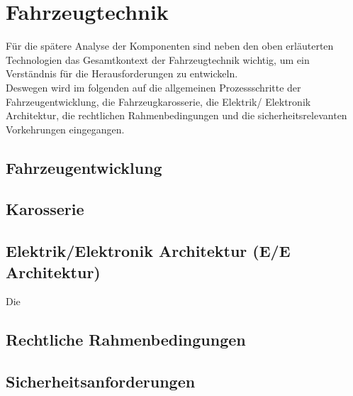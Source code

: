 \section{Fahrzeugtechnik}
Für die spätere Analyse der Komponenten sind neben den oben erläuterten Technologien das Gesamtkontext der Fahrzeugtechnik wichtig, um ein Verständnis für die Herausforderungen zu entwickeln.\\
Deswegen wird im folgenden auf die allgemeinen Prozessschritte der Fahrzeugentwicklung, die Fahrzeugkarosserie, die Elektrik/ Elektronik Architektur, die rechtlichen Rahmenbedingungen und die sicherheitsrelevanten Vorkehrungen eingegangen.
\subsection{Fahrzeugentwicklung}
\subsection{Karosserie}
\subsection{Elektrik/Elektronik Architektur (E/E Architektur)}
Die


\subsection{Rechtliche Rahmenbedingungen}

\subsection{Sicherheitsanforderungen}